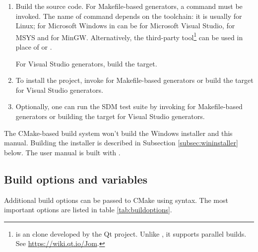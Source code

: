 \documentclass[a4paper,12pt,twoside,extrafontsizes]{memoir}
\begin{document}
\begin{enumerate}[resume]
	\item Build the source code. For Makefile-based generators, a  command must be invoked. The name of  command depends on the toolchain: it is usually  for Linux; for Microsoft Windows in can be  for Microsoft Visual Studio,  for MSYS and  for MinGW. Alternatively, the third-party  tool\footnote{ is an  clone developed by the Qt project. Unlike , it supports parallel builds. See \url{https://wiki.qt.io/Jom}.} can be used in place of  or .
	
	For Visual Studio generators, build the  target.
	
	\item To install the project, invoke  for Makefile-based generators or build the  target for Visual Studio generators.
	
	\item Optionally, one can run the SDM test suite by invoking  for Makefile-based generators or building the  target for Visual Studio generators.
\end{enumerate}

The CMake-based build system won't build the Windows installer and this manual. Building the installer is described in Subsection \ref{subsec:wininstaller} below. The user manual is built with .

\subsection{Build options and variables}
\label{subsec:buildoptions}

Additional build options can be passed to CMake using  syntax. The most important options are listed in table \ref{tab:buildoptions}.
\end{document}
